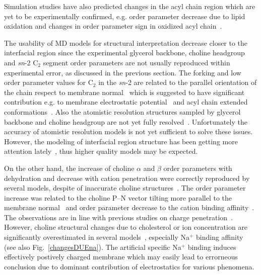 \documentclass[aps,prl,superscriptaddress,twocolumn]{revtex4}
\begin{document}
Simulation studies have also predicted changes in the acyl chain region which are yet to be experimentally 
confirmed, e.g. order parameter decrease due to lipid oxidation and changes in order parameter sign in oxidized 
acyl chain~\cite{ekkabut07}. %

The usability of MD models for structural interpretation decrease closer to the interfacial region since the
experimental glycerol backbone, choline headgroup and {\it sn}-2 C$_2$ segment order parameters are 
not usually reproduced within experimental error, as discussed in the previous section. 
The forking and low order parameter values for C$_2$ in the {\it sn}-2 are related
to the parallel orientation of the chain respect to membrane normal~\cite{schindler75,seelig75}
which is suggested to have significant contribution e.g. to membrane electrostatic potential~\cite{gawrisch92}
and acyl chain extended conformations~\cite{kinnunen12}.
Also the atomistic resolution structures sampled by glycerol backbone and choline headgroup are not yet fully 
resolved~\cite{gally75,seelig77,strenk85,akutsu91,bruzik97,Semchyschyn04}.
Unfortunately the accuracy of atomistic resolution models is not yet sufficient to solve these issues.
However, the modeling of interfacial region structure has been getting more attention lately~\cite{klauda10,prakash10,dickson12,chowdhary13,botan15}, 
thus higher quality models may be expected.  

On the other hand, the increase of choline $\alpha$ and $\beta$ order parameters with dehydration 
and decrease with cation penetration were correctly reproduced by several models, 
despite of inaccurate choline structures~\cite{botan15,ionpaper}. The order parameter increase
was related to the choline P--N vector tilting more parallel to the membrane normal~\cite{botan15}
and order parameter decrease to the cation binding affinity~\cite{ionpaper}. 
The observations are in line with previous studies on charge penetration~\cite{akutsu81,altenbach84,seelig87,scherer89}.
However, choline structural changes due to cholesterol or ion concentration are significantly overestimated
in several models~\cite{ferreira13,botan15,ionpaper,madej15}, especially Na$^{+}$ binding affinity~\cite{ionpaper} (see also Fig.~\ref{changesDUEna}). 
The artificial specific Na$^{+}$  binding induces effectively postively charged membrane which may easily
lead to errorneous conclusion due to dominant contribution of electrostatics for various phenomena.
\end{document}
